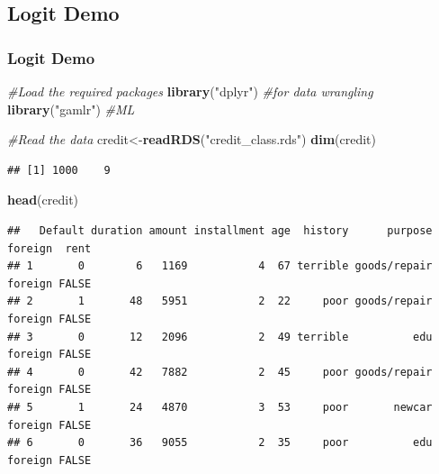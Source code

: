 \documentclass[
  shownotes,
  xcolor={svgnames},
  hyperref={colorlinks,citecolor=DarkBlue,linkcolor=DarkRed,urlcolor=DarkBlue}
  , aspectratio=169]{beamer}
\newenvironment{Shaded}{\begin{snugshade}}{\end{snugshade}}
\newcommand{\CommentTok}[1]{\textcolor[rgb]{0.56,0.35,0.01}{\textit{#1}}}
\newcommand{\KeywordTok}[1]{\textcolor[rgb]{0.13,0.29,0.53}{\textbf{#1}}}
\newcommand{\NormalTok}[1]{#1}
\newcommand{\StringTok}[1]{\textcolor[rgb]{0.31,0.60,0.02}{#1}}
\begin{document}
\subsection{Logit Demo}
\begin{frame}[fragile]
\frametitle{Logit Demo}


\begin{scriptsize}
\begin{Shaded}
\begin{Highlighting}[]
\CommentTok{\#Load the required packages}
\KeywordTok{library}\NormalTok{(}\StringTok{"dplyr"}\NormalTok{) }\CommentTok{\#for data wrangling}
\KeywordTok{library}\NormalTok{(}\StringTok{"gamlr"}\NormalTok{) }\CommentTok{\#ML}

\CommentTok{\#Read the data}
\NormalTok{credit\textless{}{-}}\KeywordTok{readRDS}\NormalTok{(}\StringTok{"credit\_class.rds"}\NormalTok{)}
\KeywordTok{dim}\NormalTok{(credit)}
\end{Highlighting}
\end{Shaded}
\end{scriptsize}

\begin{tiny}
\begin{verbatim}
## [1] 1000    9
\end{verbatim}
\end{tiny}


\begin{scriptsize}
\begin{Shaded}
\begin{Highlighting}[]
\KeywordTok{head}\NormalTok{(credit)}
\end{Highlighting}
\end{Shaded}
\end{scriptsize}

\begin{tiny}
\begin{verbatim}
##   Default duration amount installment age  history      purpose foreign  rent
## 1       0        6   1169           4  67 terrible goods/repair foreign FALSE
## 2       1       48   5951           2  22     poor goods/repair foreign FALSE
## 3       0       12   2096           2  49 terrible          edu foreign FALSE
## 4       0       42   7882           2  45     poor goods/repair foreign FALSE
## 5       1       24   4870           3  53     poor       newcar foreign FALSE
## 6       0       36   9055           2  35     poor          edu foreign FALSE
\end{verbatim}
\end{tiny}


\end{frame}
\end{document}
